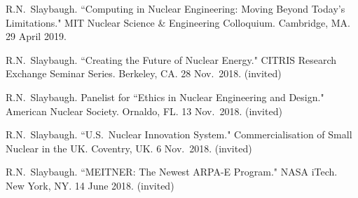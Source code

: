 \begin{bibsection}



\item R.N.\ Slaybaugh. ``Computing in Nuclear Engineering: Moving Beyond Today's Limitations." MIT Nuclear Science \& Engineering Colloquium. Cambridge, MA. 29 April 2019.



\item R.N.\ Slaybaugh. ``Creating the Future of Nuclear Energy." CITRIS Research Exchange Seminar Series. Berkeley, CA. 28 Nov.\ 2018. (invited)


\item R.N.\ Slaybaugh. Panelist for ``Ethics in Nuclear Engineering and Design." American Nuclear Society. Ornaldo, FL. 13 Nov.\ 2018. (invited)

\item R.N.\ Slaybaugh.  ``U.S.\ Nuclear Innovation System." Commercialisation of Small Nuclear in the UK. Coventry, UK. 6 Nov.\ 2018. (invited)

\item R.N.\ Slaybaugh.  ``MEITNER: The Newest ARPA-E Program." NASA iTech. New York, NY. 14 June 2018. (invited)


\end{bibsection}
